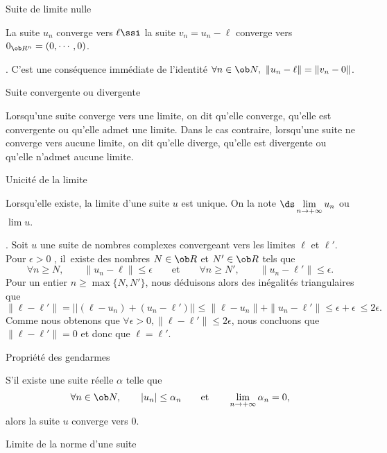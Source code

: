 %


\Concept [Index=Suites!limites!limite nulle] Suite de limite nulle

La suite $u_n$ converge vers $\ell\ssi$ la suite $v_n=u_n-\ell$ converge vers $0_{\ob R^n}=(0,\cdots, 0)$.

\Demonstration. C'est une cons\'equence imm\'ediate de l'identit\'e $\forall n\in\ob N, \ \|u_n-\ell\|=\|v_n-0\|$. \CQFD

%

\Concept [Index=Suites!convergente] Suite convergente ou divergente

\Definition 
Lorsqu'une suite converge vers une limite, on dit qu'elle converge, qu'elle est convergente ou qu'elle admet une limite. \pn
Dans le cas contraire, lorsqu'une suite ne converge vers aucune limite, on dit qu'elle diverge, qu'elle est divergente ou qu'elle 
n'admet aucune limite. 

\Concept [Index=Suites!limites!Unicite@Unicit\'e]Unicit\'e de la limite

\Propriete 
Lorsqu'elle existe, la limite d'une suite $u$ est unique. On la note $\ds\lim\limits_{n\to+\infty}u_n$ ou $\lim u$. 

\Demonstration. Soit $u$ une suite de nombres complexes convergeant vers les limites $\ell$ et $\ell'$.  Pour $\epsilon>0$ , il~existe des nombres $N\in\ob R$ et $N'\in\ob R$ tels que 
$$
\forall n\ge N, \qquad \|u_n-\ell\|\le \epsilon\qquad\mbox{et}\qquad 
\forall n\ge N', \qquad \|u_n-\ell'\|\le \epsilon. 
$$ 
Pour un entier $n\ge\max\{N,N'\}$, nous d\'eduisons alors des in\'egalit\'es triangulaires que 
$$
{\|\ell-\ell'\|}=\big|\big|(\ell-u_n)+(u_n-\ell')\big|\big|\le \|\ell-u_n\|+\|u_n-\ell'\|\le \epsilon+\epsilon\ {\le2\epsilon.}
$$ 
Comme nous obtenons que $\forall \epsilon>0, \|\ell-\ell'\|\le2\epsilon$, nous concluons que $\|\ell-\ell'\|=0$ et donc que 
$\ell=\ell'$. 
\CQFD


\Concept [Index=Suites!Propri\'et\'e des gendarmes] Propri\'et\'e des gendarmes

S'il existe une suite r\'eelle $\alpha$ telle que 
$$
\forall n\in\ob N, \qquad |u_n|\le \alpha_n\qquad \mbox{et}\qquad \lim_{n\to+\infty}\alpha_n=0, 
$$
alors la suite $u$ converge vers $0$. 


\Concept [Index=Suites!limites!limite de $\|u\|$] Limite de la norme d'une suite

